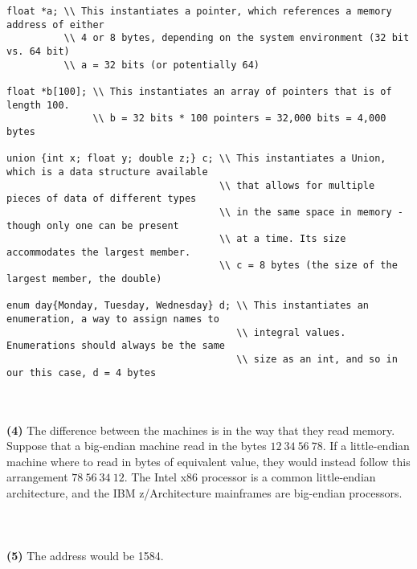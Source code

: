 \documentclass[a4paper,9pt]{extarticle}
\begin{document}
\begin{verbatim}
float *a; \\ This instantiates a pointer, which references a memory address of either
          \\ 4 or 8 bytes, depending on the system environment (32 bit vs. 64 bit)
          \\ a = 32 bits (or potentially 64)
          
float *b[100]; \\ This instantiates an array of pointers that is of length 100.
               \\ b = 32 bits * 100 pointers = 32,000 bits = 4,000 bytes
               
union {int x; float y; double z;} c; \\ This instantiates a Union, which is a data structure available 
                                     \\ that allows for multiple pieces of data of different types
                                     \\ in the same space in memory - though only one can be present
                                     \\ at a time. Its size accommodates the largest member.
                                     \\ c = 8 bytes (the size of the largest member, the double)
                                     
enum day{Monday, Tuesday, Wednesday} d; \\ This instantiates an enumeration, a way to assign names to
                                        \\ integral values. Enumerations should always be the same 
                                        \\ size as an int, and so in our this case, d = 4 bytes
\end{verbatim}~\\\\
\textbf{(4)}
The difference between the machines is in the way that they read memory. Suppose that a big-endian machine read in the bytes $12~34~56~78$. If a little-endian machine where to read in bytes of equivalent value, they would instead follow this arrangement $78~56~34~12$. The Intel x86 processor is a common little-endian architecture, and the IBM z/Architecture mainframes are big-endian processors.
\\\\\\\\
\textbf{(5)}
The address would be 1584.
\end{document}
